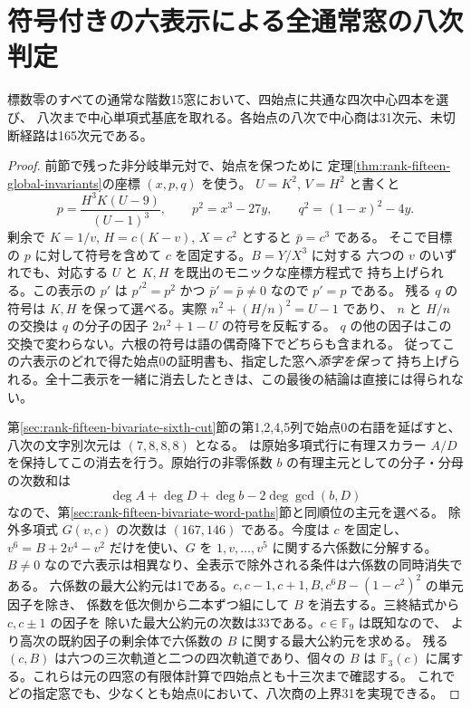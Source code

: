 \section{符号付きの六表示による全通常窓の八次判定}
\label{sec:rank-fifteen-oriented-eighth-cut}
\begin{theorem}
標数零のすべての通常な階数15窓において、四始点に共通な四次中心四本を選び、
八次まで中心単項式基底を取れる。各始点の八次で中心商は31次元、未切断経路は165次元である。
\end{theorem}
\begin{proof}
前節で残った非分岐単元対で、始点を保つために
定理\ref{thm:rank-fifteen-global-invariants}の座標 $(x,p,q)$ を使う。
$U=K^2$, $V=H^2$ と書くと
\[
 p=\frac{H^3K(U-9)}{(U-1)^3},\qquad p^2=x^3-27y,\qquad
 q^2=(1-x)^2-4y.
\]
剰余で $K=1/v$, $H=c(K-v)$, $X=c^2$ とすると $\bar p=c^3$ である。
そこで目標の $p$ に対して符号を含めて $c$ を固定する。$B=Y/X^3$ に対する
六つの $v$ のいずれでも、対応する $U$ と $K,H$ を既出のモニックな座標方程式で
持ち上げられる。この表示の $p'$ は $p'^2=p^2$ かつ $\bar p'=\bar p\ne0$ なので $p'=p$ である。
残る $q$ の符号は $K,H$ を保って選べる。実際 $n^2+(H/n)^2=U-1$ であり、
$n$ と $H/n$ の交換は $q$ の分子の因子 $2n^2+1-U$ の符号を反転する。
$q$ の他の因子はこの交換で変わらない。六根の符号は語の偶奇降下でどちらも含まれる。
従ってこの六表示のどれで得た始点0の証明書も、指定した窓へ\emph{添字を保って}
持ち上げられる。全十二表示を一緒に消去したときは、この最後の結論は直接には得られない。

第\ref{sec:rank-fifteen-bivariate-sixth-cut}節の第1,2,4,5列で始点0の右語を延ばすと、
八次の文字別次元は $(7,8,8,8)$ となる。
 は原始多項式行に有理スカラー
$A/D$ を保持してこの消去を行う。原始行の非零係数 $b$ の有理主元としての分子・分母の次数和は
\[
 \deg A+\deg D+\deg b-2\deg\gcd(b,D)
\]
なので、第\ref{sec:rank-fifteen-bivariate-word-paths}節と同順位の主元を選べる。
除外多項式 $G(v,c)$ の次数は $(167,146)$ である。今度は $c$ を固定し、
$v^6=B+2v^4-v^2$ だけを使い、$G$ を $1,v,\ldots,v^5$ に関する六係数に分解する。
$B\ne0$ なので六表示は相異なり、全表示で除外される条件は六係数の同時消失である。
六係数の最大公約元は1である。$c,c-1,c+1,B,c^6B-(1-c^2)^2$ の単元因子を除き、
係数を低次側から二本ずつ組にして $B$ を消去する。三終結式から $c,c\pm1$ の因子を
除いた最大公約元の次数は33である。$c\in\mathbb F_9$ は既知なので、
より高次の既約因子の剰余体で六係数の $B$ に関する最大公約元を求める。
残る $(c,B)$ は六つの三次軌道と二つの四次軌道であり、個々の $B$ は
$\mathbb F_3(c)$ に属する。これらは元の四窓の有限体計算で四始点とも十三次まで確認する。
これでどの指定窓でも、少なくとも始点0において、八次商の上界31を実現できる。


\end{proof}
